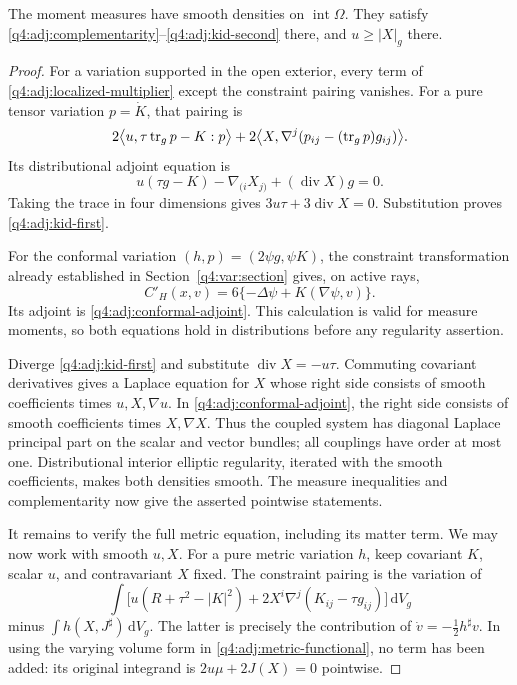 \begin{lemma}
\label{q4:adj:interior-equations}
The moment measures have smooth densities on $\operatorname{int}\Omega$.
They satisfy \eqref{q4:adj:complementarity}--\eqref{q4:adj:kid-second} there, and
$u\ge|X|_g$ there.
\end{lemma}

\begin{proof}
For a variation supported in the open exterior, every term of
\eqref{q4:adj:localized-multiplier} except the constraint pairing vanishes.
For a pure tensor variation $p=\dot K$, that pairing is
\[
 2\bigl\langle u,\tau\operatorname{tr}_g p-K:p\bigr\rangle
 +2\bigl\langle X,\nabla^j(p_{ij}-(\operatorname{tr}_g p)g_{ij})\bigr\rangle.
\]
Its distributional adjoint equation is
\begin{equation}
 u(\tau g-K)-\nabla_{(i}X_{j)}+(\operatorname{div}X)g=0.
 \label{q4:adj:tensor-adjoint}
\end{equation}
Taking the trace in four dimensions gives
$3u\tau+3\operatorname{div}X=0$.  Substitution proves
\eqref{q4:adj:kid-first}.

For the conformal variation $(h,p)=(2\psi g,\psi K)$, the constraint
transformation already established in Section~\ref{q4:var:section} gives,
on active rays,
\[
 C'_H(x,v)=6\{-\Delta\psi+K(\nabla\psi,v)\}.
\]
Its adjoint is \eqref{q4:adj:conformal-adjoint}.  This calculation is valid for
measure moments, so both equations hold in distributions before any
regularity assertion.

Diverge \eqref{q4:adj:kid-first} and substitute
$\operatorname{div}X=-u\tau$.  Commuting covariant derivatives gives a Laplace
equation for $X$ whose right side consists of smooth coefficients times
$u,X,\nabla u$.  In \eqref{q4:adj:conformal-adjoint}, the right side consists of
smooth coefficients times $X,\nabla X$.  Thus the coupled system has diagonal
Laplace principal part on the scalar and vector bundles; all couplings have
order at most one.  Distributional interior elliptic regularity, iterated
with the smooth coefficients, makes both densities smooth.  The measure
inequalities and complementarity now give the asserted pointwise statements.

It remains to verify the full metric equation, including its matter term.
We may now work with smooth $u,X$.  For a pure metric variation $h$, keep
covariant $K$, scalar $u$, and contravariant $X$ fixed.  The constraint pairing
is the variation of
\begin{equation}
 \int\bigl[u(R+\tau^2-|K|^2)
      +2X^i\nabla^j(K_{ij}-\tau g_{ij})\bigr]\,\mathrm dV_g
 \label{q4:adj:metric-functional}
\end{equation}
minus $\int h(X,J^\sharp)\,\mathrm dV_g$.
The latter is precisely the contribution of $\dot v=-\tfrac12h^\sharp v$.
In using the varying volume form in \eqref{q4:adj:metric-functional}, no term
has been added: its original integrand is
$2u\mu+2J(X)=0$ pointwise.


\end{proof}
